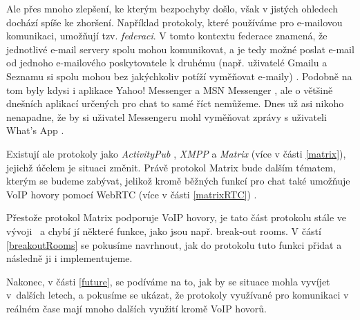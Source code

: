 Ale přes mnoho zlepšení, ke kterým bezpochyby došlo, však v jistých ohledech
dochází spíše ke zhoršení. Například protokoly, které používáme pro e-mailovou
komunikaci, umožňují tzv. \textit{federaci}. V tomto kontextu federace znamená,
že jednotlivé e-mail servery spolu mohou komunikovat, a je tedy možné poslat
e-mail od jednoho e-mailového poskytovatele k druhému (např. uživatelé Gmailu a
Seznamu si spolu mohou bez jakýchkoliv potíží vyměňovat e-maily)
\cite{MatrixORG-FAQ}. Podobně na tom byly kdysi i aplikace Yahoo! Messenger a
MSN Messenger \cite{BetaNews-MSYahooToLinkIMNets}, ale o většině dnešních
aplikací určených pro chat to samé říct nemůžeme. Dnes už asi nikoho nenapadne,
že by si uživatel Messengeru mohl vyměňovat zprávy s uživateli What's App
\cite{9To5Mac-InteroperabilityNightmareAndDream}.

Existují ale protokoly jako \textit{ActivityPub} \cite{W3ORG-ActivityPub},
\textit{XMPP} \cite{XMPPORG-Homepage} a \textit{Matrix}
\cite{MatrixORG-Homepage} (více v části \ref{matrix}), jejichž účelem je situaci
změnit. Právě protokol Matrix bude dalším tématem, kterým se budeme zabývat,
jelikož kromě běžných funkcí pro chat také umožňuje VoIP hovory pomocí WebRTC
(více v části \ref{matrixRTC}) \cite{MatrixORG-Homepage,MatrixORG-Spec}.

Přestože protokol Matrix podporuje VoIP hovory, je tato část protokolu stále
ve vývoji~\cite{GitHub-MSC3401,GitHub-MSC3898} a chybí jí některé funkce, jako
jsou např. break-out rooms. V částí \ref{breakoutRooms} se pokusíme navrhnout,
jak do protokolu tuto funkci přidat a následně ji i implementujeme.

Nakonec, v části \ref{future}, se podíváme na to, jak by se situace mohla
vyvíjet v~dalších letech, a pokusíme se ukázat, že protokoly využívané pro
komunikaci v reálném čase mají mnoho dalších využití kromě VoIP hovorů.
